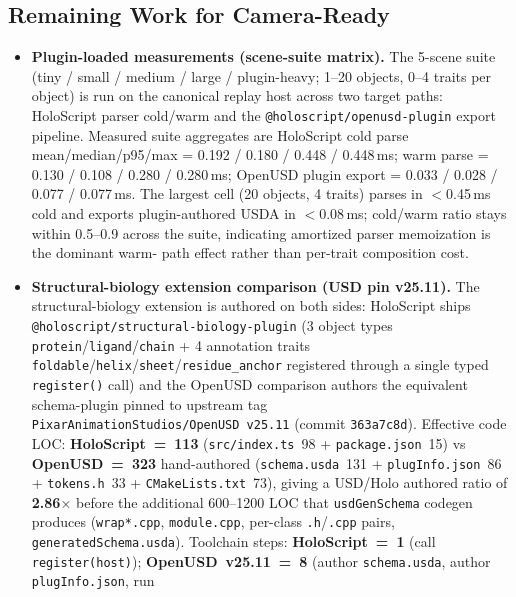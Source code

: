 \documentclass[sigconf,nonacm]{acmart}
\providecommand{\measuredFrom}[1]{}
\begin{document}
\subsection{Remaining Work for Camera-Ready}
\begin{itemize}
  \item \textbf{Plugin-loaded measurements (scene-suite matrix).} The
5-scene suite (tiny / small / medium / large / plugin-heavy; 1--20
objects, 0--4 traits per object) is run on the canonical replay host
across two target paths: HoloScript parser cold/warm and the
\texttt{@holoscript/openusd-plugin} export pipeline. Measured suite
aggregates are HoloScript cold parse mean/median/p95/max =
0.192 / 0.180 / 0.448 / 0.448\,ms; warm parse =
0.130 / 0.108 / 0.280 / 0.280\,ms; OpenUSD plugin export =
0.033 / 0.028 / 0.077 / 0.077\,ms. The largest cell (20 objects, 4
traits) parses in $<$0.45\,ms cold and exports plugin-authored USDA
in $<$0.08\,ms; cold/warm ratio stays within 0.5--0.9 across the
suite, indicating amortized parser memoization is the dominant warm-
path effect rather than per-trait composition cost.
\measuredFrom{HoloScript/packages/comparative-benchmarks/src/__tests__/paper-12-scene-suite-overhead.bench.test.ts}%
\measuredFrom{HoloScript/.bench-logs/2026-04-27-paper-12-scene-suite-overhead.md}
  \item \textbf{Structural-biology extension comparison (USD pin v25.11).}
The structural-biology extension is authored on both sides: HoloScript
ships \texttt{@holoscript/structural-biology-plugin} (3 object types
\texttt{protein}/\texttt{ligand}/\texttt{chain} + 4 annotation traits
\texttt{foldable}/\texttt{helix}/\texttt{sheet}/\texttt{residue\_anchor}
registered through a single typed \texttt{register()} call) and the
OpenUSD comparison authors the equivalent schema-plugin pinned to
upstream tag \texttt{PixarAnimationStudios/OpenUSD~v25.11} (commit
\texttt{363a7c8d}). Effective code LOC: \textbf{HoloScript~=~113}
(\texttt{src/index.ts}~98 + \texttt{package.json}~15) vs
\textbf{OpenUSD~=~323} hand-authored (\texttt{schema.usda}~131 +
\texttt{plugInfo.json}~86 + \texttt{tokens.h}~33 +
\texttt{CMakeLists.txt}~73), giving a USD/Holo authored ratio of
\textbf{2.86$\times$} before the additional 600--1200 LOC that
\texttt{usdGenSchema} codegen produces (\texttt{wrap*.cpp},
\texttt{module.cpp}, per-class \texttt{.h}/\texttt{.cpp} pairs,
\texttt{generatedSchema.usda}). Toolchain steps: \textbf{HoloScript~=~1}
(call \texttt{register(host)}); \textbf{OpenUSD~v25.11~=~8} (author
\texttt{schema.usda}, author \texttt{plugInfo.json}, run

\end{itemize}
\end{document}
